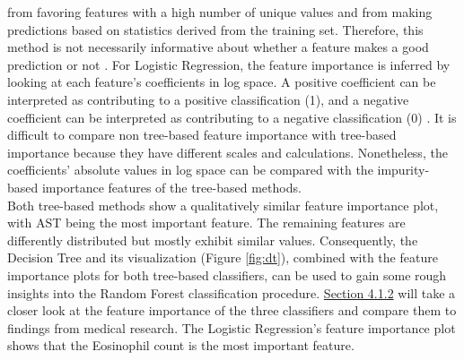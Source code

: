 from favoring features with a high number of unique values and from making 
predictions based on statistics derived from the training set. Therefore, this 
method is not necessarily informative about whether a feature makes a 
good prediction or not \cite{RN178}.
For Logistic Regression, the feature importance is inferred by looking at 
each feature's coefficients in log space. A positive coefficient can be 
interpreted as contributing to a positive classification (1), and a negative 
coefficient can be interpreted as contributing to a negative classification (0) 
\cite{RN174}.
It is difficult to compare non tree-based feature importance with tree-based 
importance because they have different scales and calculations. Nonetheless, 
the 
coefficients' absolute values in log space can be compared with the 
impurity-based importance features of the tree-based methods.
\\
Both tree-based methods show a qualitatively similar feature importance plot, 
with AST being the most important feature. The remaining features are 
differently distributed but mostly exhibit similar values. Consequently, the 
Decision Tree and its visualization (Figure \ref{fig:dt}), combined with the 
feature importance plots for both tree-based classifiers, can be used to gain 
some rough insights into the Random Forest classification procedure. 
\hyperref[sec:medical]{Section 4.1.2} will take a closer look at the feature 
importance of the three classifiers and compare them to findings from medical 
research. The Logistic Regression's feature importance plot shows that the 
Eosinophil count is the most important feature.

